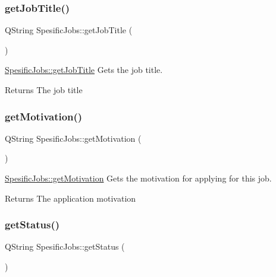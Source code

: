 \subsubsection{\texorpdfstring{get\+Job\+Title()}{getJobTitle()}}
{\footnotesize\ttfamily Q\+String Spesific\+Jobs\+::get\+Job\+Title (\begin{DoxyParamCaption}{ }\end{DoxyParamCaption})}



\hyperlink{class_spesific_jobs_afe77ad902d3e9f3cfd5f057e0a37a193}{Spesific\+Jobs\+::get\+Job\+Title} Gets the job title. 

\begin{DoxyReturn}{Returns}
The job title 
\end{DoxyReturn}
\mbox{\label{class_spesific_jobs_a73406f6204c990c3fa3c7b9d16f1b0b9}} 
\subsubsection{\texorpdfstring{get\+Motivation()}{getMotivation()}}
{\footnotesize\ttfamily Q\+String Spesific\+Jobs\+::get\+Motivation (\begin{DoxyParamCaption}{ }\end{DoxyParamCaption})}



\hyperlink{class_spesific_jobs_a73406f6204c990c3fa3c7b9d16f1b0b9}{Spesific\+Jobs\+::get\+Motivation} Gets the motivation for applying for this job. 

\begin{DoxyReturn}{Returns}
The application motivation 
\end{DoxyReturn}
\mbox{\label{class_spesific_jobs_aefe905d920961199fec0aff37a34b50d}} 
\subsubsection{\texorpdfstring{get\+Status()}{getStatus()}}
{\footnotesize\ttfamily Q\+String Spesific\+Jobs\+::get\+Status (\begin{DoxyParamCaption}{ }\end{DoxyParamCaption})}



